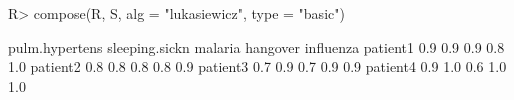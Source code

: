 \begin{Schunk}
% --begin: "comp.basic"
\begin{Sinput}
R> compose(R, S, alg = "lukasiewicz", type = "basic")
\end{Sinput}
\begin{Soutput}
         pulm.hypertens sleeping.sickn malaria hangover influenza
patient1            0.9            0.9     0.9      0.8       1.0
patient2            0.8            0.8     0.8      0.8       0.9
patient3            0.7            0.9     0.7      0.9       0.9
patient4            0.9            1.0     0.6      1.0       1.0
\end{Soutput}
%
% --end: "comp.basic"
\end{Schunk}
